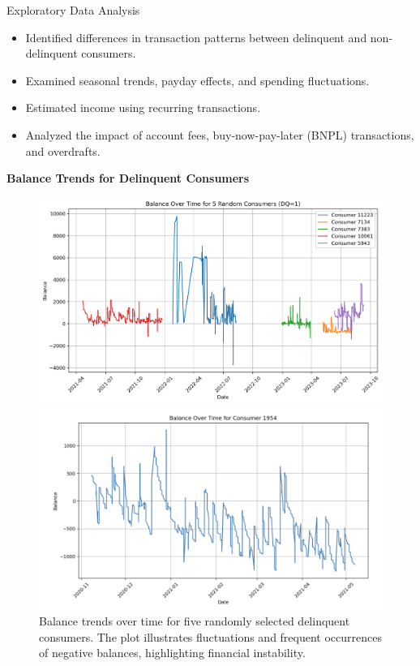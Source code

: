 \documentclass[final]{beamer}
\newlength{\colwidth}
\begin{document}
\begin{frame}[t]
\begin{columns}[t]
\begin{column}{\colwidth}
\begin{block}{Exploratory Data Analysis}
    \begin{itemize}
        \item Identified differences in transaction patterns between delinquent and non-delinquent consumers.
        \item Examined seasonal trends, payday effects, and spending fluctuations.
        \item Estimated income using recurring transactions.
        \item Analyzed the impact of account fees, buy-now-pay-later (BNPL) transactions, and overdrafts.
    \end{itemize}

    \textbf{Balance Trends for Delinquent Consumers}
    
    \begin{figure}[H]
        \centering
        \begin{minipage}{0.48\textwidth}
            \centering
            \includegraphics[width=\textwidth]{figure/balance_delinquent.png}
            \caption{Balance trends over time for five randomly selected delinquent consumers. The plot illustrates fluctuations and frequent occurrences of negative balances, highlighting financial instability.}
            \label{fig:balance_delinquent}
        \end{minipage}
        \hfill
        \begin{minipage}{0.48\textwidth}
            \centering
            \includegraphics[width=\textwidth]{figure/balance_single_delinquent.png}

\end{minipage}
\end{figure}
\end{block}
\end{column}
\end{columns}
\end{frame}
\end{document}
